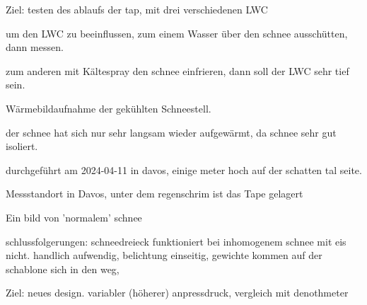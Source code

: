 \label{ErstFeldVer}
Ziel: testen des ablaufs der tap, mit drei verschiedenen LWC

um den LWC zu beeinflussen, zum einem Wasser über den schnee ausschütten, dann messen.

zum anderen mit Kältespray den schnee einfrieren, dann soll der LWC sehr tief sein. \caption{Wärmebildaufnahme der gekühlten Schneestell. }

der schnee hat sich nur sehr langsam wieder aufgewärmt, da schnee sehr gut isoliert.

durchgeführt am 2024-04-11 in davos, einige meter hoch auf der schatten tal seite.
\caption{Messstandort in Davos, unter dem regenschrim ist das Tape gelagert} 

\caption{Ein bild von 'normalem' schnee}

schlussfolgerungen: schneedreieck funktioniert bei inhomogenem schnee mit eis nicht.
handlich aufwendig, belichtung einseitig, gewichte kommen auf der schablone sich in den weg,

\label{ZweiFeldVer}
Ziel: neues design. variabler (höherer) anpressdruck, vergleich mit denothmeter
